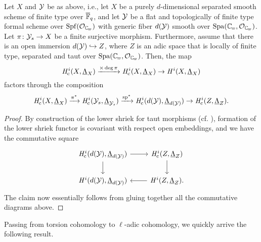 \documentclass[../main.tex]{subfiles}
\begin{document}
\begin{prop}\label{thm:SubspaceInjectionFiniteLevel}
  Let $X$ and $\mathcal{Y}$ be as above, i.e., let $X$ be a purely $d$-dimensional
  separated smooth scheme of finite type over ${\overline {\mathbb{F}}_q}$, and let 
  $\mathcal{Y}$ be a flat and topologically of finite type formal scheme over
  $\Spf(\cO_\Cp)$ with generic fiber $d(\mathcal{Y})$ smooth over $\spa(\Cp,\cO_\Cp)$.
  Let $\pi\colon \mathcal{Y}_s \to X$ be a finite surjective morphism.
  Furthermore, assume that there is an open immersion
  $d(\mathcal{Y}) \hookrightarrow Z$, where
  $Z$ is an adic space that is locally of finite type, separated and taut
  over $\spa(\Cp, \cO_\Cp)$.
  Then, the map 
  \begin{equation*}
    \mathit H_{\mathrm{c}}^i(X, \underline \Lambda_X) \xrightarrow{\times \deg \pi} 
    \mathit H_{\mathrm{c}}^i(X, \underline \Lambda_X) \to 
    \mathit H^i(X,   \underline \Lambda_X)
  \end{equation*}
  factors through the composition
  \begin{equation*}
    \mathit H_{\mathrm{c}}^i(X,      \underline \Lambda_X) \xrightarrow{\pi^*}
    \mathit H_{\mathrm{c}}^i(\mathcal{Y}_s,  \underline \Lambda_{\mathcal{Y}_s}) \xrightarrow{\mathrm{sp}^*}
    \mathit H_{\mathrm{c}}^i(d(\mathcal{Y}), \underline \Lambda_{d(\mathcal{Y})}) \to 
    \mathit H_{\mathrm{c}}^i(Z,      \underline \Lambda_Z).
  \end{equation*}
\begin{proof}
  By construction of the lower shriek for taut morphisms (cf. \cite[Section 0.4
  D)]{huber2013etale}), formation of the lower shriek functor is covariant with
  respect open embeddings, and we have the commutative square
  \begin{equation*}
    \begin{tikzcd}[ampersand replacement=\&]
      {\hHc^i(d(\cY), \underline \Lambda_{d(\cY)})} \& 
      {\hHc^i(Z, \underline \Lambda_{Z})} \\
    	{\hH^i(d(\cY), \underline \Lambda_{d(\cY)})} \& 
      {\hH^i(Z, \underline \Lambda_{Z})}.
    	\arrow[from=1-1, to=1-2]
    	\arrow[from=1-1, to=2-1]
    	\arrow[from=1-2, to=2-2]
    	\arrow[from=2-2, to=2-1]
    \end{tikzcd}
  \end{equation*}
  The claim now essentially follows from gluing together all the commutative
  diagrams above. 
\end{proof}
\end{prop}

Passing from torsion cohomology to $\ell$-adic cohomology, we quickly arrive
the following result.
\end{document}
